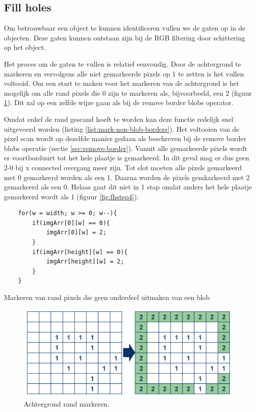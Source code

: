 \subsection{Fill holes}

Om betrouwbaar een object te kunnen identificeren vullen we de gaten op in de
objecten. Deze gaten kunnen ontstaan zijn bij de RGB filtering door schittering
op het object.

Het proces om de gaten te vullen is relatief eenvoudig. Door de achtergrond te
markeren en vervolgens alle niet gemarkeerde pixels op 1 te zetten is het vullen
voltooid. Om een start te maken voor het markeren van de achtergrond is het
mogelijk om alle rand pixels die 0 zijn te markeren als, bijvoorbeeld, een 2
(figuur \ref{fig:fhstep1}). Dit zal op een zelfde wijze gaan als bij de remove
border blobs operator.

Omdat enkel de rand gescand hoeft te worden kan deze functie redelijk snel
uitgevoerd worden (listing \ref{list:mark-non-blob-borders}). Het voltooien van
de pixel scan wordt op dezelfde manier gedaan als beschreven bij de remove
border blobs operatie (sectie \ref{sec:remove-border}). Vanuit alle gemarkeerde
pixels wordt er voortborduurt tot het hele plaatje is gemarkeerd. In dit geval
mag er dus geen 2-0 bij x connected overgang meer zijn. Tot slot moeten alle
pixels gemarkeerd met 0 gemarkeerd worden als een 1. Daarna worden de pixels
gemkarkeerd met 2 gemarkeerd als een 0. Helaas gaat dit niet in 1 stap omdat
anders het hele plaatje gemarkeerd wordt als 1 (figuur \ref{fig:fhstep4}).

\begin{listing}
    \begin{verbatim}
    for(w = width; w >= 0; w--){
        if(imgArr[0][w] == 0){
            imgArr[0][w] = 2;
        }
        if(imgArr[height][w] == 0){
            imgArr[height][w] = 2;
        }
    }
    \end{verbatim}
    \caption{Markeren van rand pixels die geen onderdeel uitmaken van een blob}
    \label{list:mark-non-blob-borders}
\end{listing}

\begin{figure}
    \begin{center}
        \includegraphics[scale=0.35]{figures/fill_holes_step1.png}
    \end{center}
    \caption{Achtergrond rand markeren.}
    \label{fig:fhstep1}
\end{figure}

